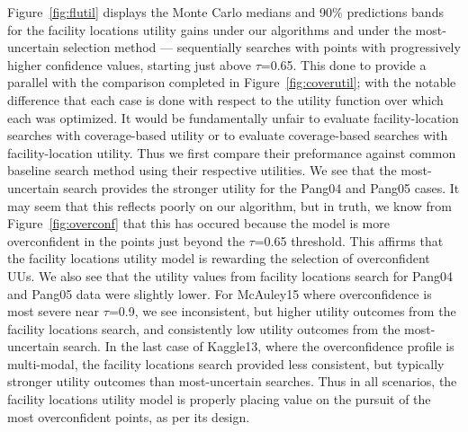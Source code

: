 \documentclass[conference]{IEEEtran}
\begin{document}
Figure~\ref{fig:flutil} displays the Monte Carlo medians and 90\% predictions bands for the facility locations utility gains under our algorithms and under the most-uncertain selection method --- sequentially searches with points with progressively higher confidence values, starting just above $\tau$=0.65. This done to provide a parallel with the comparison completed in Figure~\ref{fig:coverutil}; with the notable difference that each case is done with respect to the utility function over which each was optimized. It would be fundamentally unfair to evaluate facility-location searches with coverage-based utility or to evaluate coverage-based searches with facility-location utility. Thus we first compare their preformance against common baseline search method using their respective utilities. We see that the most-uncertain search provides the stronger utility for the Pang04 and Pang05 cases. It may seem that this reflects poorly on our algorithm, but in truth, we know from Figure~\ref{fig:overconf} that this has occured because the model is more overconfident in the points just beyond the $\tau$=0.65 threshold. This affirms that the facility locations utility model is rewarding the selection of overconfident UUs. We also see that the utility values from facility locations search for Pang04 and Pang05 data were slightly lower. For McAuley15 where overconfidence is most severe near $\tau$=0.9, we see inconsistent, but higher utility outcomes from the facility locations search, and consistently low utility outcomes from the most-uncertain search. In the last case of Kaggle13, where the overconfidence profile is multi-modal, the facility locations search provided less consistent, but typically stronger utility outcomes than most-uncertain searches. Thus in all scenarios, the facility locations utility model is properly placing value on the pursuit of the most overconfident points, as per its design.

\end{document}
